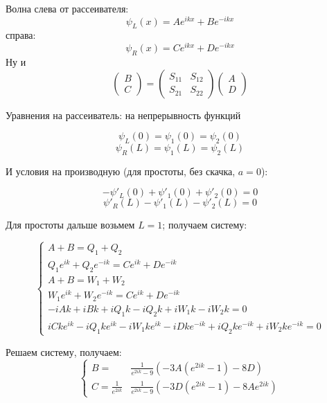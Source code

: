 





Волна слева от рассеивателя:
\[
\psi_L(x) = A e^{i k x} + B e^{-i k x}
\]
справа:
\[
\psi_R(x) = C e^{i k x} + D e^{-i k x}
\]
Ну и
\[
\begin{pmatrix}B \\ C \end{pmatrix} = \begin{pmatrix} S_{11} & S_{12} \\ S_{21} & S_{22} \end{pmatrix}\begin{pmatrix} A \\ D \end{pmatrix}
\]


Уравнения на рассеиватель: на непрерывность функций

\[
\psi_L(0) = \psi_1(0) = \psi_2(0)
\]
\[
\psi_R(L) = \psi_1(L) = \psi_2(L)
\]

И условия на производную (для простоты, без скачка, $a=0$):

\[
-\psi'_L(0) + \psi'_1(0) + \psi'_2(0) = 0
\]
\[
\psi'_R(L) - \psi'_1(L) - \psi'_2(L) = 0
\]

Для простоты дальше возьмем $L=1$; получаем систему:

\[
\begin{cases}
A + B = Q_1 + Q_2 \\
Q_1 e^{i k} + Q_2 e^{-i k} = C e^{i k} + D e^{-i k} \\
A + B = W_1 + W_2 \\
W_1 e^{i k} + W_2 e^{-i k} = C e^{i k} + D e^{-i k} \\
-i A k + i B k + i Q_1 k - i Q_2 k + i W_1 k - i W_2 k = 0 \\
i C k e^{i k} - i Q_1 k e^{i k} - i W_1 k e^{i k} - i D k e^{-i k} + i Q_2 k e^{-i k} + i W_2 k e^{-i k} = 0
\end{cases}
\]

Решаем систему, получаем:
\[
\begin{cases}
B =                     & \frac{1}{e^{2 i k} - 9} ( -3 A (e^{2 i k} - 1) - 8 D ) \\ 
C = \frac{1}{e^{2 i k}} & \frac{1}{e^{2 i k} - 9} ( -3 D (e^{2 i k} - 1) - 8 A e^{2 i k} ) 
\end{cases}
\]

